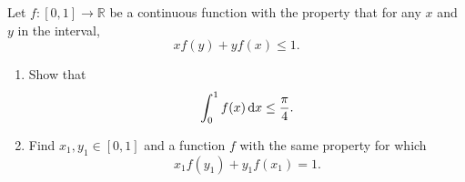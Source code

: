 \documentclass{article}
\begin{document}
	\setlength{\parindent}{0pt}
	Let $f:[0,1]\to\mathbb{R}$ be a continuous function with the property that for any $x$ and $y$ in the interval,
	$$xf(y)+yf(x)\leq1.$$
	\begin{enumerate}[label=\alph*)]
		\item Show that
		$$\int_{0}^{1}f(x)\,\textup{d}x\leq\frac{\pi}{4}.$$
		\item  Find $x_1,y_1\in[0,1]$ and a function $f$ with the same property for which
		$$x_1f(y_1)+y_1f(x_1)=1.$$
	\end{enumerate}
\end{document}
